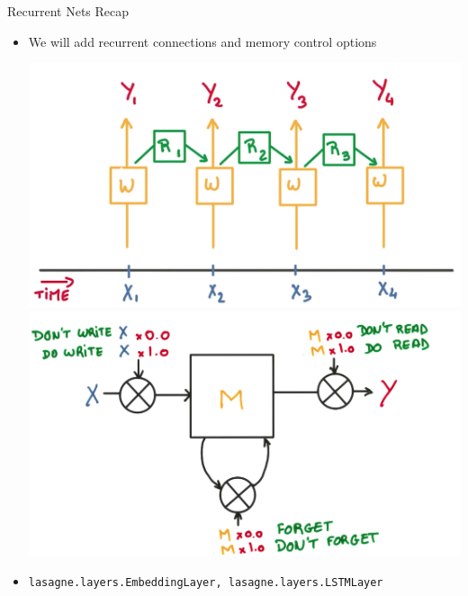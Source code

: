 \documentclass{beamer}
\begin{document}
\begin{frame}{Recurrent Nets Recap}
\begin{itemize}
		\item  We will add recurrent connections and memory control options
		\begin{center}
			 \includegraphics[scale=0.13]{img/rec2}
			 \includegraphics[scale=0.1]{img/lstm}
		\end{center}
	\item  \texttt{lasagne.layers.EmbeddingLayer, lasagne.layers.LSTMLayer}
	\end{itemize}
\end{frame}
\end{document}
